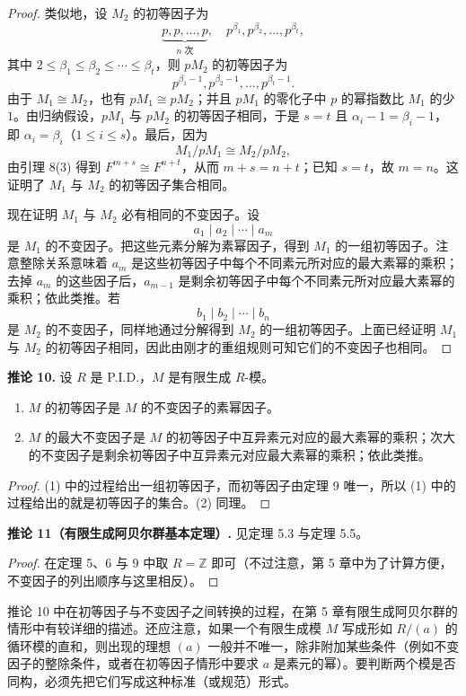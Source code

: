 \begin{proof}
类似地，设 $M_2$ 的初等因子为
\[
\underbrace{p,p,\ldots,p}_{n\text{ 次}},\quad p^{\beta_1},p^{\beta_2},\ldots,p^{\beta_t},
\]
其中 $2\leq\beta_1\leq\beta_2\leq\cdots\leq\beta_t$，则 $pM_2$ 的初等因子为
\[
p^{\beta_1-1},p^{\beta_2-1},\ldots,p^{\beta_t-1}.
\]
由于 $M_1\cong M_2$，也有 $pM_1\cong pM_2$；并且 $pM_1$ 的零化子中 $p$ 的幂指数比 $M_1$ 的少 $1$。由归纳假设，$pM_1$ 与 $pM_2$ 的初等因子相同，于是 $s=t$ 且 $\alpha_i-1=\beta_i-1$，即 $\alpha_i=\beta_i$（$1\leq i\leq s$）。最后，因为
\[
M_1/pM_1\cong M_2/pM_2,
\]
由引理 8(3) 得到 $F^{m+s}\cong F^{n+t}$，从而 $m+s=n+t$；已知 $s=t$，故 $m=n$。这证明了 $M_1$ 与 $M_2$ 的初等因子集合相同。

现在证明 $M_1$ 与 $M_2$ 必有相同的不变因子。设
\[
a_1\mid a_2\mid\cdots\mid a_m
\]
是 $M_1$ 的不变因子。把这些元素分解为素幂因子，得到 $M_1$ 的一组初等因子。注意整除关系意味着 $a_m$ 是这些初等因子中每个不同素元所对应的最大素幂的乘积；去掉 $a_m$ 的这些因子后，$a_{m-1}$ 是剩余初等因子中每个不同素元所对应最大素幂的乘积；依此类推。若
\[
b_1\mid b_2\mid\cdots\mid b_n
\]
是 $M_2$ 的不变因子，同样地通过分解得到 $M_2$ 的一组初等因子。上面已经证明 $M_1$ 与 $M_2$ 的初等因子相同，因此由刚才的重组规则可知它们的不变因子也相同。
\end{proof}

\noindent\textbf{推论 10.} 设 $R$ 是 P.I.D.，$M$ 是有限生成 $R$-模。
\begin{enumerate}[label=(\arabic*)]
\item $M$ 的初等因子是 $M$ 的不变因子的素幂因子。
\item $M$ 的最大不变因子是 $M$ 的初等因子中互异素元对应的最大素幂的乘积；次大的不变因子是剩余初等因子中互异素元对应最大素幂的乘积；依此类推。
\end{enumerate}

\begin{proof}
(1) 中的过程给出一组初等因子，而初等因子由定理 9 唯一，所以 (1) 中的过程给出的就是初等因子的集合。(2) 同理。
\end{proof}

\noindent\textbf{推论 11（有限生成阿贝尔群基本定理）.} 见定理 5.3 与定理 5.5。

\begin{proof}
在定理 5、6 与 9 中取 $R=\mathbb Z$ 即可（不过注意，第 5 章中为了计算方便，不变因子的列出顺序与这里相反）。
\end{proof}

推论 10 中在初等因子与不变因子之间转换的过程，在第 5 章有限生成阿贝尔群的情形中有较详细的描述。还应注意，如果一个有限生成模 $M$ 写成形如 $R/(a)$ 的循环模的直和，则出现的理想 $(a)$ 一般并不唯一，除非附加某些条件（例如不变因子的整除条件，或者在初等因子情形中要求 $a$ 是素元的幂）。要判断两个模是否同构，必须先把它们写成这种标准（或规范）形式。
